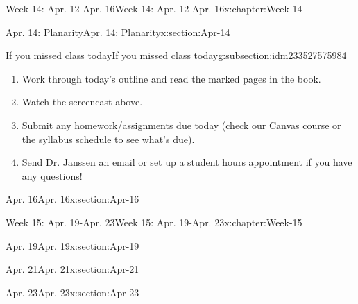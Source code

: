\documentclass[oneside,10pt,]{book}
\numberwithin{equation}{section}
\begin{document}
\begin{chapterptx}{Week 14: Apr. 12-Apr. 16}{}{Week 14: Apr. 12-Apr. 16}{}{}{x:chapter:Week-14}
\begin{sectionptx}{Apr. 14: Planarity}{}{Apr. 14: Planarity}{}{}{x:section:Apr-14}
%
%
\typeout{************************************************}
\typeout{************************************************}
%
\begin{subsectionptx}{If you missed class today}{}{If you missed class today}{}{}{g:subsection:idm233527575984}
%
\begin{enumerate}
\item{}Work through today's outline and read the marked pages in the book.%
\item{}Watch the screencast above.%
\item{}Submit any homework\slash{}assignments due today (check our \href{https://dordt.instructure.com/courses/3110050}{Canvas course} or the \href{https://prof.mkjanssen.org/ds/index.html\#schedule}{syllabus schedule} to see what's due).%
\item{}\href{mailto:mike.janssen@dordt.edu}{Send Dr. Janssen an email} or \href{https://calendly.com/mkjanssen/student-hours}{set up a student hours appointment} if you have any questions!%
\end{enumerate}
\end{subsectionptx}
\end{sectionptx}
%
%
\typeout{************************************************}
\typeout{************************************************}
%
\begin{sectionptx}{Apr. 16}{}{Apr. 16}{}{}{x:section:Apr-16}
\end{sectionptx}
\end{chapterptx}
%
%
\typeout{************************************************}
\typeout{************************************************}
%
\begin{chapterptx}{Week 15: Apr. 19-Apr. 23}{}{Week 15: Apr. 19-Apr. 23}{}{}{x:chapter:Week-15}
%
%
\typeout{************************************************}
\typeout{************************************************}
%
\begin{sectionptx}{Apr. 19}{}{Apr. 19}{}{}{x:section:Apr-19}
\end{sectionptx}
%
%
\typeout{************************************************}
\typeout{************************************************}
%
\begin{sectionptx}{Apr. 21}{}{Apr. 21}{}{}{x:section:Apr-21}
\end{sectionptx}
%
%
\typeout{************************************************}
\typeout{************************************************}
%
\begin{sectionptx}{Apr. 23}{}{Apr. 23}{}{}{x:section:Apr-23}
\end{sectionptx}
\end{chapterptx}
\end{document}
